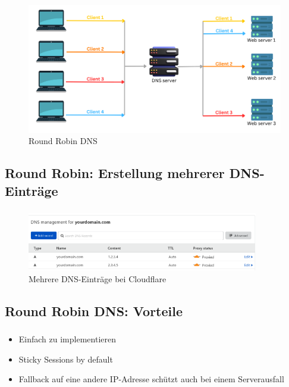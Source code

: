 \begin{frame}
    \frametitle{\insertsection}
    \framesubtitle{\insertsubsection}

	\vspace*{-12pt}
    \begin{figure}[h]
        \centering
        \captionsetup{aboveskip=0pt}
        \includegraphics[width=.7\textwidth]{../images/roundrobindns}
        \caption{Round Robin DNS~\cite{cloudns-roundrobin}}
    \end{figure}
\end{frame}

\subsection{Round Robin: Erstellung mehrerer DNS-Einträge}
\begin{frame}
    \frametitle{\insertsection}
    \framesubtitle{\insertsubsection}

	\vspace{-12pt} %
    \begin{figure}[h]
        \centering
        \includegraphics[width=0.9\textwidth]{../images/cloudflare-multiple-dns}
        \caption{Mehrere DNS-Einträge bei Cloudflare}
    \end{figure}
\end{frame}

\subsection{Round Robin DNS: Vorteile}
\begin{frame}
    \frametitle{\insertsection}
    \framesubtitle{\insertsubsection}

    \begin{itemize}
    	\item Einfach zu implementieren
    	\item Sticky Sessions by default
    	\item Fallback auf eine andere IP-Adresse schützt auch bei einem Serverausfall
    \end{itemize}
\end{frame}

